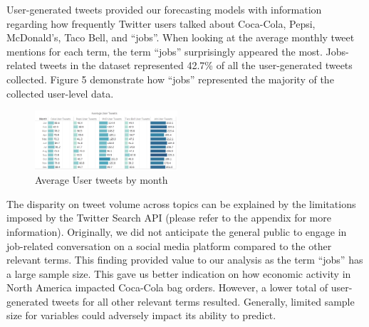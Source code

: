 \documentclass[12pt,oneside]{chicagocapstone}
\begin{document}
User-generated tweets provided our forecasting models with information regarding how frequently Twitter users talked about Coca-Cola, Pepsi, McDonald's, Taco Bell, and ``jobs''. When looking at the average monthly tweet mentions for each term, the term ``jobs'' surprisingly appeared the most. Jobs-related tweets in the dataset represented 42.7\% of all the user-generated tweets collected. Figure 5 demonstrate how ``jobs'' represented the majority of the collected user-level data.
\begin{figure}

{\centering \includegraphics[width=200px,angle = 0, scale=2.1]{figure/AveUserTweets} 

}

\caption{Average User tweets by month}\label{fig:AveUserTweet}
\end{figure}
The disparity on tweet volume across topics can be explained by the limitations imposed by the Twitter Search API (please refer to the appendix for more information). Originally, we did not anticipate the general public to engage in job-related conversation on a social media platform compared to the other relevant terms. This finding provided value to our analysis as the term ``jobs'' has a large sample size. This gave us better indication on how economic activity in North America impacted Coca-Cola bag orders. However, a lower total of user-generated tweets for all other relevant terms resulted. Generally, limited sample size for variables could adversely impact its ability to predict.
\end{document}
